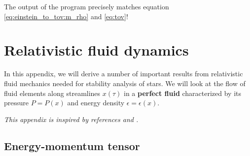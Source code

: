 
The output of the program precisely matches equation \eqref{eq:einstein_to_tov:m_rho} and \eqref{eq:tov}!


\chapter{Relativistic fluid dynamics}
\label{chap:relfluid}

In this appendix, we will derive a number of important results from relativistic fluid mechanics needed for stability analysis of stars.
We will look at the flow of fluid elements along streamlines $x(\tau)$ in a \textbf{perfect fluid} characterized by its pressure $P = P(x)$ and energy density $\epsilon = \epsilon(x)$.

\textit{This appendix is inspired by references \cite{ref:mtw} and \cite{ref:weinberg_gravity}.}

\section{Energy-momentum tensor}

